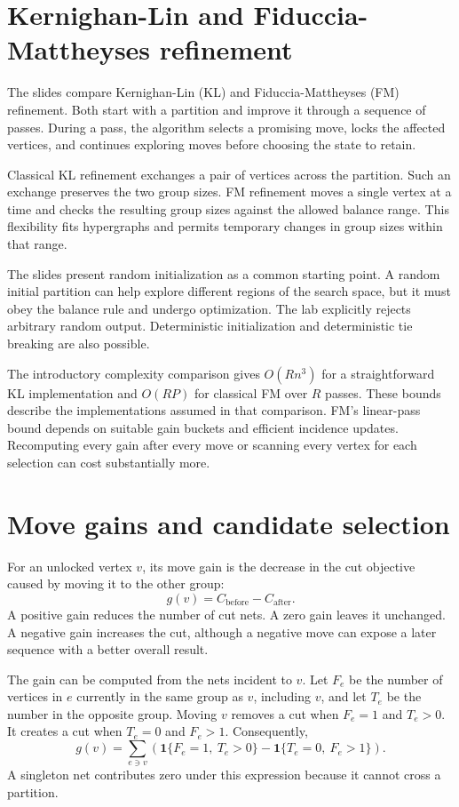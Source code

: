 \documentclass[11pt,a4paper]{article}
\begin{document}
\section{Kernighan-Lin and Fiduccia-Mattheyses refinement}

The slides compare Kernighan-Lin (KL) and Fiduccia-Mattheyses (FM) refinement. Both start with a partition and improve it through a sequence of passes. During a pass, the algorithm selects a promising move, locks the affected vertices, and continues exploring moves before choosing the state to retain.

Classical KL refinement exchanges a pair of vertices across the partition. Such an exchange preserves the two group sizes. FM refinement moves a single vertex at a time and checks the resulting group sizes against the allowed balance range. This flexibility fits hypergraphs and permits temporary changes in group sizes within that range.

The slides present random initialization as a common starting point. A random initial partition can help explore different regions of the search space, but it must obey the balance rule and undergo optimization. The lab explicitly rejects arbitrary random output. Deterministic initialization and deterministic tie breaking are also possible.

The introductory complexity comparison gives $O(Rn^3)$ for a straightforward KL implementation and $O(RP)$ for classical FM over $R$ passes. These bounds describe the implementations assumed in that comparison. FM's linear-pass bound depends on suitable gain buckets and efficient incidence updates. Recomputing every gain after every move or scanning every vertex for each selection can cost substantially more.

\section{Move gains and candidate selection}

For an unlocked vertex $v$, its move gain is the decrease in the cut objective caused by moving it to the other group:
\[
 g(v)=C_{\mathrm{before}}-C_{\mathrm{after}}.
\]
A positive gain reduces the number of cut nets. A zero gain leaves it unchanged. A negative gain increases the cut, although a negative move can expose a later sequence with a better overall result.

The gain can be computed from the nets incident to $v$. Let $F_e$ be the number of vertices in $e$ currently in the same group as $v$, including $v$, and let $T_e$ be the number in the opposite group. Moving $v$ removes a cut when $F_e=1$ and $T_e>0$. It creates a cut when $T_e=0$ and $F_e>1$. Consequently,
\[
 g(v)=\sum_{e\ni v}
 \left(\mathbf{1}\{F_e=1,\ T_e>0\}
       -\mathbf{1}\{T_e=0,\ F_e>1\}\right).
\]
A singleton net contributes zero under this expression because it cannot cross a partition.
\end{document}
